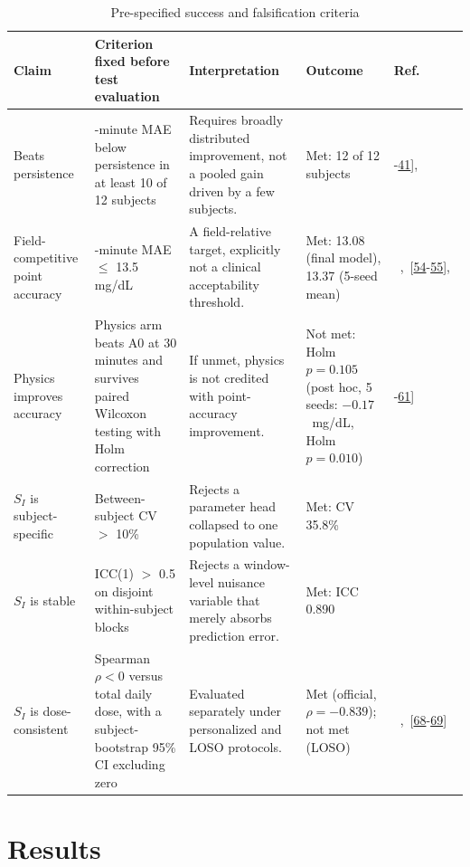 \documentclass[journal]{IEEEtran}
\begin{document}
\begin{table}[t]
\centering
\caption{Pre-specified success and falsification criteria}
\label{tab:falsification}
\footnotesize
\begin{tabular}{>{\raggedright\arraybackslash}p{2.3cm}>{\raggedright\arraybackslash}p{4.4cm}>{\raggedright\arraybackslash}p{4.4cm}>{\raggedright\arraybackslash}p{3.0cm}>{\raggedright\arraybackslash}p{1.9cm}}
\toprule
Claim & Criterion fixed before test evaluation & Interpretation & Outcome & Ref. \\
\midrule
Beats persistence & 30-minute MAE below persistence in at least 10 of 12 subjects & Requires broadly distributed improvement, not a pooled gain driven by a few subjects. & Met: 12 of 12 subjects & [\hyperref[ref30label]{40}-\hyperref[ref31label]{41}],~\cite{ref57} \\
Field-competitive point accuracy & 30-minute MAE $\leq$ 13.5 mg/dL & A field-relative target, explicitly not a clinical acceptability threshold. & Met: 13.08 (final model), 13.37 (5-seed mean) &~\cite{ref31},~[\hyperref[ref43label]{54}-\hyperref[ref44label]{55}],~\cite{ref64} \\
Physics improves accuracy & Physics arm beats A0 at 30 minutes and survives paired Wilcoxon testing with Holm correction & If unmet, physics is not credited with point-accuracy improvement. & Not met: Holm $p = 0.105$ (post hoc, 5 seeds: $-0.17$~mg/dL, Holm $p = 0.010$) & [\hyperref[ref48label]{60}-\hyperref[ref49label]{61}] \\
$S_I$ is subject-specific & Between-subject CV $>$ 10\% & Rejects a parameter head collapsed to one population value. & Met: CV 35.8\% &~\cite{ref1,ref32} \\
$S_I$ is stable & ICC(1) $>$ 0.5 on disjoint within-subject blocks & Rejects a window-level nuisance variable that merely absorbs prediction error. & Met: ICC 0.890 &~\cite{ref50,ref76} \\
$S_I$ is dose-consistent & Spearman $\rho < 0$ versus total daily dose, with a subject-bootstrap 95\% CI excluding zero & Evaluated separately under personalized and LOSO protocols. & Met (official, $\rho = -0.839$); not met (LOSO) &~\cite{ref51},~[\hyperref[ref77label]{68}-\hyperref[ref78label]{69}] \\
\bottomrule
\end{tabular}
\end{table}


\section{Results}
\end{document}
